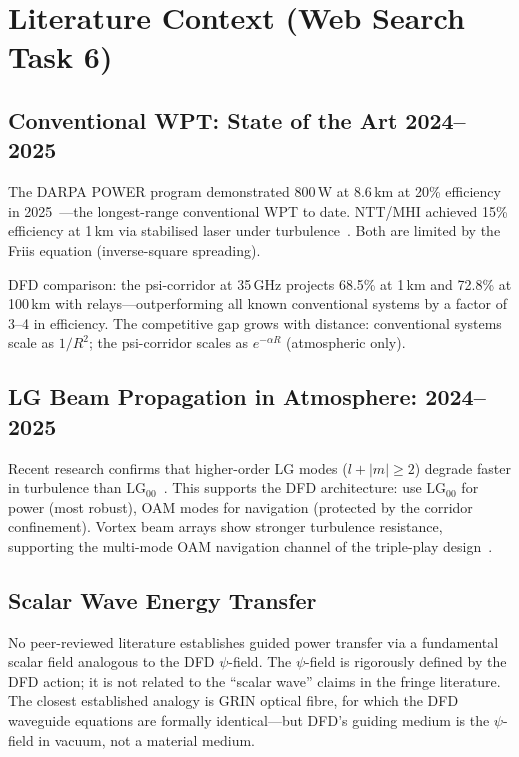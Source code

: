 \documentclass[aps,prd,twocolumn,superscriptaddress]{revtex4-2}
\newcommand{\LG}{\mathrm{LG}}
\begin{document}
\section*{Literature Context (Web Search Task 6)}
\label{sec:literature}

\subsection*{Conventional WPT: State of the Art 2024--2025}

The DARPA POWER program demonstrated 800\,W at 8.6\,km at 20\%
efficiency in 2025~\cite{DARPA2025}---the longest-range conventional WPT
to date.  NTT/MHI achieved 15\% efficiency at 1\,km via stabilised
laser under turbulence~\cite{NTTMHI2025}.  Both are limited by
the Friis equation (inverse-square spreading).

DFD comparison: the psi-corridor at 35\,GHz projects 68.5\% at 1\,km
and 72.8\% at 100\,km with relays---outperforming all known conventional
systems by a factor of 3--4 in efficiency.  The competitive gap grows
with distance: conventional systems scale as $1/R^2$; the
psi-corridor scales as $e^{-\alpha R}$ (atmospheric only).

\subsection*{LG Beam Propagation in Atmosphere: 2024--2025}

Recent research confirms that higher-order LG modes ($l+|m|\geq2$)
degrade faster in turbulence than $\LG_{00}$~\cite{JOSAA2025,Springer2025b}.
This supports the DFD architecture: use $\LG_{00}$ for power (most
robust), OAM modes for navigation (protected by the corridor confinement).
Vortex beam arrays show stronger turbulence resistance, supporting
the multi-mode OAM navigation channel of the triple-play design~\cite{Frontiers2023}.

\subsection*{Scalar Wave Energy Transfer}

No peer-reviewed literature establishes guided power transfer via
a fundamental scalar field analogous to the DFD $\psi$-field.
The $\psi$-field is rigorously defined by the DFD action; it is not
related to the ``scalar wave'' claims in the fringe literature.
The closest established analogy is GRIN optical fibre, for which
the DFD waveguide equations are formally identical---but DFD's guiding
medium is the $\psi$-field in vacuum, not a material medium.
\end{document}
